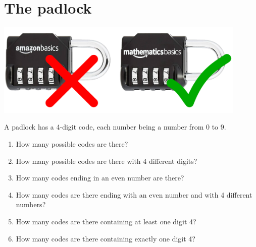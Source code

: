 \documentclass[]{article}
\begin{document}
	\section{The padlock}
	\begin{center}
		\includegraphics[width=12cm]{locks.pdf}
	\end{center}
	A padlock has a 4-digit code, each number being a number from 0 to 9.
	\begin{enumerate}
		\item How many possible codes are there?
		\item How many possible codes are there with 4 different digits?
		\item How many codes ending in an even number are there?
		\item How many codes are there ending with an even number and with 4 different numbers?
		\item How many codes are there containing at least one digit 4?
		\item How many codes are there containing exactly one digit 4?
	\end{enumerate}
	
\end{document}
